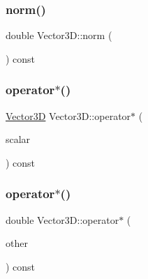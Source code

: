 \mbox{\label{classVector3D_a176d25c8beea995c9cbf9fb4ad57b87a}} 
\subsubsection{\texorpdfstring{norm()}{norm()}}
{\footnotesize\ttfamily double Vector3\+D\+::norm (\begin{DoxyParamCaption}{ }\end{DoxyParamCaption}) const}

\mbox{\label{classVector3D_ad27fdc97ad2e142ccb6261759e481b1f}} 
\subsubsection{\texorpdfstring{operator$\ast$()}{operator*()}\hspace{0.1cm}{\footnotesize\ttfamily [1/2]}}
{\footnotesize\ttfamily \mbox{\hyperlink{classVector3D}{Vector3D}} Vector3\+D\+::operator$\ast$ (\begin{DoxyParamCaption}\item[{const double \&}]{scalar }\end{DoxyParamCaption}) const}

\mbox{\label{classVector3D_a4086e97bd4845c0934a023d59b71ebc1}} 
\subsubsection{\texorpdfstring{operator$\ast$()}{operator*()}\hspace{0.1cm}{\footnotesize\ttfamily [2/2]}}
{\footnotesize\ttfamily double Vector3\+D\+::operator$\ast$ (\begin{DoxyParamCaption}\item[{const \mbox{\hyperlink{classVector3D}{Vector3D}} \&}]{other }\end{DoxyParamCaption}) const}

\mbox{\label{classVector3D_a30e301e07305ca5eb90d33296d53dc04}} 
